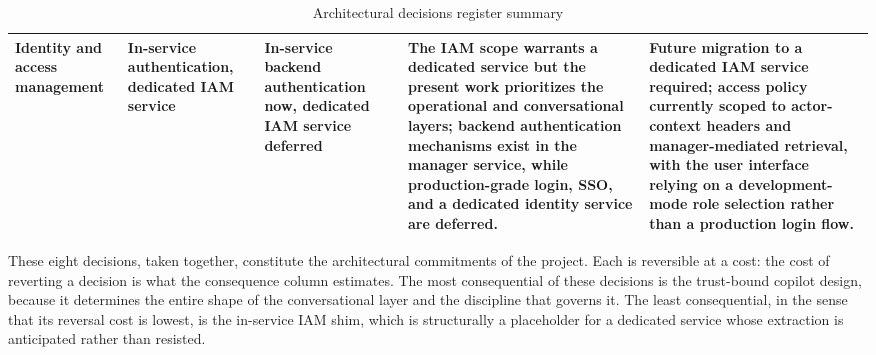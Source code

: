 \begin{table}[H]
\begin{tabular}{|p{2.6cm}|p{2.5cm}|p{2.5cm}|p{3cm}|p{3cm}|}
Identity and access management & In-service authentication, dedicated IAM service & In-service backend authentication now, dedicated IAM service deferred & The IAM scope warrants a dedicated service but the present work prioritizes the operational and conversational layers; backend authentication mechanisms exist in the manager service, while production-grade login, SSO, and a dedicated identity service are deferred. & Future migration to a dedicated IAM service required; access policy currently scoped to actor-context headers and manager-mediated retrieval, with the user interface relying on a development-mode role selection rather than a production login flow. \\ \hline
\end{tabular}
\caption{Architectural decisions register summary}
\label{tab:decisions}
\end{table}

These eight decisions, taken together, constitute the architectural commitments of the project. Each is reversible at a cost: the cost of reverting a decision is what the consequence column estimates. The most consequential of these decisions is the trust-bound copilot design, because it determines the entire shape of the conversational layer and the discipline that governs it. The least consequential, in the sense that its reversal cost is lowest, is the in-service IAM shim, which is structurally a placeholder for a dedicated service whose extraction is anticipated rather than resisted.

